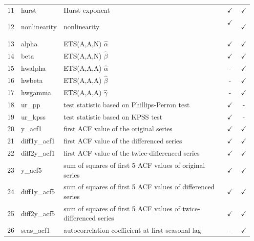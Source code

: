 \documentclass[11pt,a4paper,]{article}
\def\yes{$\checkmark$}
\begin{document}
\begin{table}[!htp]
\begin{tabular}{llp{}cc}
11 & hurst          & Hurst exponent                                                                          & \yes  & \yes \\
12 & nonlinearity   & nonlinearity                                                                            & \yes\ & \yes \\
13 & alpha          & ETS(A,A,N) $\hat\alpha$                                                                 & \yes  & \yes \\
14 & beta           & ETS(A,A,N) $\hat\beta$                                                                  & \yes  & \yes\\
15 & hwalpha        & ETS(A,A,A) $\hat\alpha$                                                                 & -     & \yes \\
16 & hwbeta         & ETS(A,A,A) $\hat\beta$                                                                  & -     & \yes \\
17 & hwgamma        & ETS(A,A,A) $\hat\gamma$                                                                 & -     & \yes \\
18 & ur\_pp         & test statistic based on Phillips-Perron test                                            & \yes  & - \\
19 & ur\_kpss       & test statistic based on KPSS test                                                       & \yes  & - \\
20 & y\_acf1        & first ACF value of the original series                                                  & \yes  & \yes \\
21 & diff1y\_acf1   & first ACF value of the differenced series                                               & \yes  & \yes \\
22 & diff2y\_acf1   & first ACF value of the twice-differenced series                                         & \yes  & \yes \\
23 & y\_acf5        & sum of squares of first 5 ACF values of original series                                 & \yes  & \yes \\
24 & diff1y\_acf5   & sum of squares of first 5 ACF values of differenced series                              & \yes  & \yes \\
25 & diff2y\_acf5   & sum of squares of first 5 ACF values of twice-differenced series                        & \yes  & \yes \\
26 & seas\_acf1     & autocorrelation coefficient at first seasonal lag                                       & -     & \yes \\

\end{tabular}
\end{table}
\end{document}

